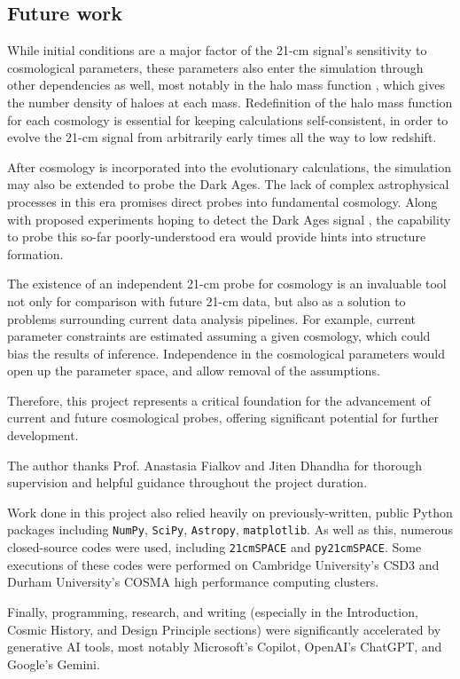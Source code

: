 \documentclass[floats,floatfix,showpacs,amssymb,prd,superscriptaddress,nofootinbib, 11pt]{revtex4-2} %
\newcommand{\code}{\texttt}
\begin{document}
\subsection{Future work}
While initial conditions are a major factor of the 21-cm signal's sensitivity to cosmological parameters, these parameters also enter the simulation through other dependencies as well, most notably in the halo mass function \citep{Murray_2013, Greig_2024}, which gives the number density of haloes at each mass. Redefinition of the halo mass function for each cosmology is essential for keeping calculations self-consistent, in order to evolve the 21-cm signal from arbitrarily early times all the way to low redshift.

After cosmology is incorporated into the evolutionary calculations, the simulation may also be extended to probe the Dark Ages. The lack of complex astrophysical processes in this era promises direct probes into fundamental cosmology. Along with proposed experiments hoping to detect the Dark Ages signal \citep{Fialkov_2024}, the capability to probe this so-far poorly-understood era would provide hints into structure formation.

The existence of an independent 21-cm probe for cosmology is an invaluable tool not only for comparison with future 21-cm data, but also as a solution to problems surrounding current data analysis pipelines. For example, current parameter constraints are estimated assuming a given cosmology, which could bias the results of inference. Independence in the cosmological parameters would open up the parameter space, and allow removal of the assumptions. 

Therefore, this project represents a critical foundation for the advancement of current and future cosmological probes, offering significant potential for further development.



\begin{acknowledgments}
The author thanks Prof. Anastasia Fialkov and Jiten Dhandha for thorough supervision and helpful guidance throughout the project duration. 

Work done in this project also relied heavily on previously-written, public Python packages including \code{NumPy}, \code{SciPy}, \code{Astropy}, \code{matplotlib}. As well as this, numerous closed-source codes were used, including \code{21cmSPACE} and \code{py21cmSPACE}. Some executions of these codes were performed on Cambridge University's CSD3 and Durham University's COSMA high performance computing clusters.

Finally, programming, research, and writing (especially in the Introduction, Cosmic History, and Design Principle sections) were significantly accelerated by generative AI tools, most notably Microsoft's Copilot, OpenAI's ChatGPT, and Google's Gemini. 
\end{acknowledgments}
\end{document}

